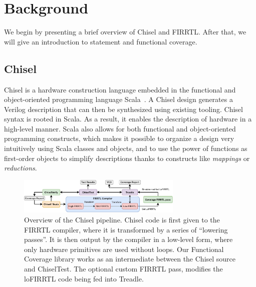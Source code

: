 \documentclass[conference]{IEEEtran}
\newcommand{\martin}[1]{{\color{blue} Martin: #1}}
\begin{document}
\section{Background}
\label{sec:background}
We begin by presenting a brief overview of Chisel and FIRRTL. 
After that, we will give an introduction to statement and functional coverage.


\subsection{Chisel}
Chisel is a hardware construction language embedded in the functional and object-oriented programming language Scala~\cite{chisel:dac2012, chisel:book, Scala}. 
A Chisel design generates a Verilog description that can then be synthesized using existing tooling. 
Chisel syntax is rooted in Scala. As a result, it enables the description of hardware in a high-level manner. 
Scala also allows for both functional and object-oriented programming constructs, which makes it possible to organize a design very intuitively using Scala classes and objects, and to use the power of functions as first-order objects to simplify descriptions thanks to constructs like \textit{mappings} or \textit{reductions}.

\begin{figure}[t]
    \centering
    \includegraphics[width=0.7\textwidth]{Chisel_FIRRTL_VERILOG_Coverage.pdf}
    \caption{Overview of the Chisel pipeline. Chisel code is first given to the FIRRTL compiler, where it is transformed by a series of ``lowering passes''. It is then output by the compiler in a low-level form, where only hardware primitives are used without loops. Our Functional Coverage library works as an intermediate between the Chisel source and ChiselTest. The optional custom FIRRTL pass, modifies the loFIRRTL code being fed into Treadle.}
\label{fig:chisel}
\end{figure}
\end{document}
